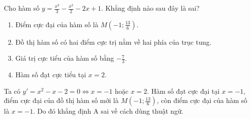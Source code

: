 \begin{baitap}
	Cho hàm số $y = \frac{x^3}{3} - \frac{x^2}{2} - 2x + 1$. Khẳng định nào sau đây là sai?
	\begin{enumerate}
		\item Điểm cực đại của hàm số là $M\left(-1; \frac{13}{6}\right)$.
		\item Đồ thị hàm số có hai điểm cực trị nằm về hai phía của trục tung.
		\item Giá trị cực tiểu của hàm số bằng $-\frac{7}{3}$.
		\item Hàm số đạt cực tiểu tại $x = 2$.
	\end{enumerate}
	\begin{traloi}
		Ta có $y' = x^2 - x - 2 = 0 \Leftrightarrow x = -1$ hoặc $x = 2$.
		Hàm số đạt cực đại tại $x = -1$, điểm cực đại của đồ thị hàm số mới là $M\left(-1; \frac{13}{6}\right)$, còn điểm cực đại của hàm số là $x = -1$. Do đó khẳng định A sai về cách dùng thuật ngữ.
	\end{traloi}
\end{baitap}
